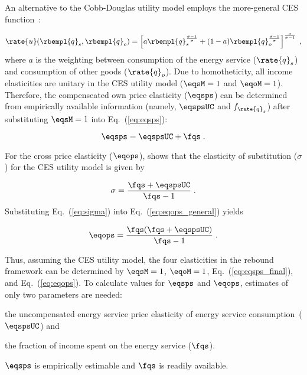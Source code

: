 An alternative to the Cobb-Douglas utility model employs 
the more-general CES function~\citep{Lemoine:2020aa}:

\begin{equation}
  \rate{u}(\rbempl{q}_s,\rbempl{q}_o) = 
      \left[ a \rbempl{q}_s^{\frac{\sigma-1}{\sigma}} 
            + (1-a) \rbempl{q}_o^{\frac{\sigma-1}{\sigma}} \right]                
                                   ^{\frac{\sigma}{\sigma-1}} \; ,
\end{equation}
%
where $a$ is the weighting between
consumption of the energy service ($\rate{q}_s$)
and consumption of other goods ($\rate{q}_o$).
Due to homotheticity,
all income elasticities are unitary in the CES utility model
($\eqsM = 1$ and $\eqoM = 1$).
Therefore,
the compenseated own price elasticity ($\eqsps$) can be
determined from empirically available information
(namely, $\eqspsUC$ and $f_{\rate{q}_s}$)
after substituting $\eqsM = 1$ into Eq.~(\ref{eq:eqsps}):

\begin{equation} \label{eq:eqsps_final}
  \eqsps = \eqspsUC + \fqs \; .
\end{equation}

For the cross price elasticity ($\eqops$),
\citet{Gortz1977} shows that
the elasticity of substitution ($\sigma$)
for the CES utility model is given by

\begin{equation} \label{eq:sigma}
  \sigma  = \frac{\fqs + \eqspsUC}{\fqs - 1} \; . 
\end{equation}
%
Substituting Eq.~(\ref{eq:sigma}) into Eq.~(\ref{eq:eqops_general}) yields

\begin{equation} \label{eq:eqops}
  \eqops = \frac{\fqs (\fqs + \eqspsUC)}{\fqs - 1} \; .
\end{equation}

Thus, assuming the CES utility model,
the four elasticities in the rebound framework can be determined by
$\eqsM = 1$,
$\eqoM = 1$,
Eq.~(\ref{eq:eqsps_final}), and
Eq.~(\ref{eq:eqops}).
To calculate values for $\eqsps$ and $\eqops$, 
estimates of only two parameters are needed:
%
\begin{enumerate*}[label={(\alph*)}]

  \item the uncompensated energy service price elasticity of energy service consumption~($\eqspsUC$) and

  \item the fraction of income spent on the energy service ($\fqs$).

\end{enumerate*}
%
$\eqsps$ is empirically estimable and $\fqs$ is readily available.
